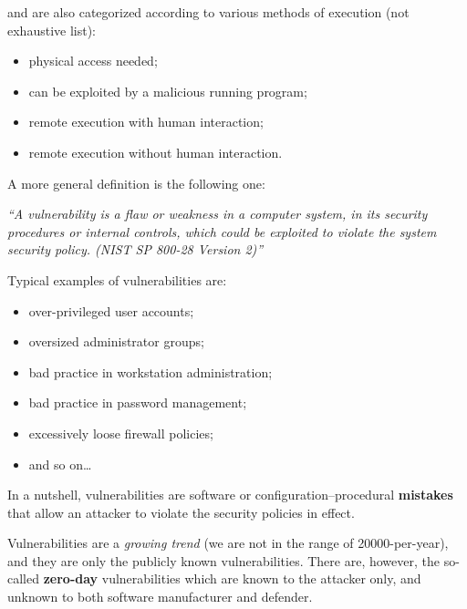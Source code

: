 \documentclass[10pt]{extreport}
\begin{document}
and are also categorized according to various methods of execution (not
exhaustive list):
\begin{itemize}
    \item physical access needed;
    \item can be exploited by a malicious running program;
    \item remote execution with human interaction;
    \item remote execution without human interaction.
\end{itemize}



A more general definition is the following one:

\vspace*{1cm}
\begin{center}
    \emph{``A vulnerability is a flaw or weakness in a computer system, in its
    security procedures or internal controls, which could be exploited to
violate the system security policy. (NIST SP 800-28 Version 2)''}
\end{center}
\vspace*{1cm}

Typical examples of vulnerabilities are:
\begin{itemize}
    \item over\--privileged user accounts;
    \item oversized administrator groups;
    \item bad practice in workstation administration;
    \item bad practice in password management;
    \item excessively loose firewall policies;
    \item and so on\dots
\end{itemize}

In a nutshell, vulnerabilities are software or configuration\---procedural
\textbf{mistakes} that allow an attacker to violate the security policies in
effect.

Vulnerabilities are a \emph{growing trend} (we are not in the range of
20000\--per\--year), and they are only the publicly known vulnerabilities.
There are, however, the so\--called \textbf{zero\--day} vulnerabilities which
are known to the attacker only, and unknown to both software manufacturer and
defender.
\end{document}
